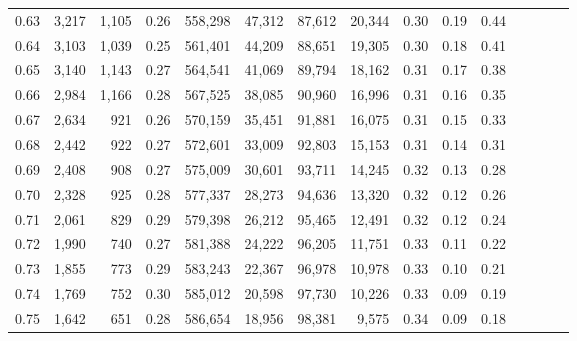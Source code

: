 \begin{tabular}{rrrcrrrrrrrrrrr}
0.63 &   3,217 &  1,105 &                                       0.26 &  558,298 &   47,312 &   87,612 &   20,344 &  0.30 &  0.19 &                         0.44 \\
0.64 &   3,103 &  1,039 &                                       0.25 &  561,401 &   44,209 &   88,651 &   19,305 &  0.30 &  0.18 &                         0.41 \\
0.65 &   3,140 &  1,143 &                                       0.27 &  564,541 &   41,069 &   89,794 &   18,162 &  0.31 &  0.17 &                         0.38 \\
0.66 &   2,984 &  1,166 &                                       0.28 &  567,525 &   38,085 &   90,960 &   16,996 &  0.31 &  0.16 &                         0.35 \\
0.67 &   2,634 &    921 &                                       0.26 &  570,159 &   35,451 &   91,881 &   16,075 &  0.31 &  0.15 &                         0.33 \\
0.68 &   2,442 &    922 &                                       0.27 &  572,601 &   33,009 &   92,803 &   15,153 &  0.31 &  0.14 &                         0.31 \\
0.69 &   2,408 &    908 &                                       0.27 &  575,009 &   30,601 &   93,711 &   14,245 &  0.32 &  0.13 &                         0.28 \\
0.70 &   2,328 &    925 &                                       0.28 &  577,337 &   28,273 &   94,636 &   13,320 &  0.32 &  0.12 &                         0.26 \\
0.71 &   2,061 &    829 &                                       0.29 &  579,398 &   26,212 &   95,465 &   12,491 &  0.32 &  0.12 &                         0.24 \\
0.72 &   1,990 &    740 &                                       0.27 &  581,388 &   24,222 &   96,205 &   11,751 &  0.33 &  0.11 &                         0.22 \\
0.73 &   1,855 &    773 &                                       0.29 &  583,243 &   22,367 &   96,978 &   10,978 &  0.33 &  0.10 &                         0.21 \\
0.74 &   1,769 &    752 &                                       0.30 &  585,012 &   20,598 &   97,730 &   10,226 &  0.33 &  0.09 &                         0.19 \\
0.75 &   1,642 &    651 &                                       0.28 &  586,654 &   18,956 &   98,381 &    9,575 &  0.34 &  0.09 &                         0.18 \\

\end{tabular}
